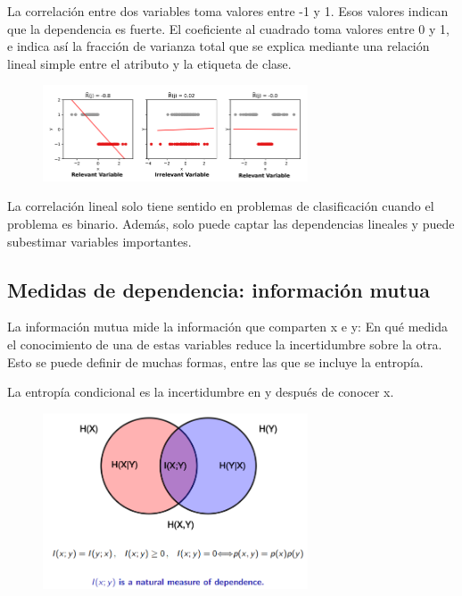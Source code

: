 La correlación entre dos variables toma valores entre -1 y 1. Esos valores indican que la dependencia es fuerte. El coeficiente al cuadrado toma valores entre 0 y 1, e indica así la fracción de varianza total que se explica mediante una relación lineal simple entre el atributo y la etiqueta de clase. 

\begin{figure}[h]
\centering
\includegraphics[width = 0.7\textwidth]{figs/linear-correlation.png}
\end{figure}

La correlación lineal solo tiene sentido en problemas de clasificación cuando el problema es binario. Además, solo puede captar las dependencias lineales y puede subestimar variables importantes. 

\subsection{Medidas de dependencia: información mutua}
La información mutua mide la información que comparten x e y: En qué medida el conocimiento de una de estas variables reduce la incertidumbre sobre la otra. Esto se puede definir de muchas formas, entre las que se incluye la entropía.

La entropía condicional es la incertidumbre en y después de conocer x.

\begin{figure}[h]
\centering
\includegraphics[width = 0.7\textwidth]{figs/mutual-information.png}
\end{figure}

